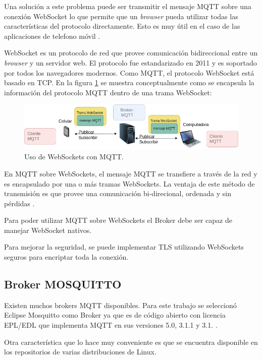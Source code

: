 Una solución a este problema puede ser transmitir el mensaje MQTT sobre una conexión WebSocket lo que permite que un \textit{browser} pueda utilizar todas las características del protocolo directamente. Esto es muy útil en el caso de las aplicaciones de telefono móvil \citep{WEBSITE:6}. 


WebSocket es un protocolo de red que provee comunicación bidireccional entre un \textit{browser} y un servidor web. El protocolo fue estandarizado en 2011 y es soportado por todos los navegadores modernos. Como MQTT, el protocolo WebSocket está basado en TCP. En la figura \ref{fig:WebSockets MQTT} se muestra conceptualmente como se encapsula la información del protocolo MQTT dentro de una trama WebSocket:

\begin{figure}[ht]
	\centering
	\includegraphics[scale=.45]{./Figures/websocket.png}
	\caption{Uso de WebSockets con MQTT.}
	\label{fig:WebSockets MQTT}
\end{figure}

En MQTT sobre WebSockets, el mensaje MQTT se transfiere a través de la red y es encapsulado por una o más tramas WebSockets. La ventaja de este método de transmisión es que provee una comunicación bi-direcional, ordenada y sin pérdidas \citep{WEBSITE:6} .

Para poder utilizar MQTT sobre WebSockets el Broker debe ser capaz de manejar WebSocket nativos. 

Para mejorar la seguridad, se puede implementar TLS utilizando WebSockets seguros para encriptar toda la conexión.

\label{subsec:Broker Mosquitto}
\subsection{Broker MOSQUITTO}

Existen muchos brokers MQTT disponibles. Para este trabajo se seleccionó Eclipse Mosquitto como Broker ya que es de código abierto con licencia EPL/EDL que implementa MQTT en sus versiones 5.0, 3.1.1 y 3.1. \citep{WEBSITE:7}.

Otra característica que lo hace muy conveniente es que se encuentra disponible en los repositorios de varias distribuciones de Linux. 




